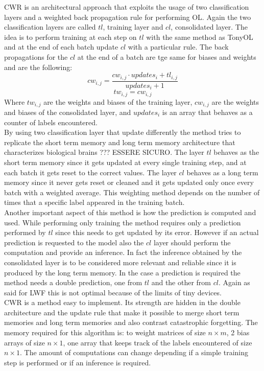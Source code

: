 \documentclass[12pt]{report}
\begin{document}
CWR is an architectural approach that exploits the usage of two classification layers and a weighted back propagation rule for performing OL. Again the two classification layers are called $tl$, training layer and $cl$, consolidated layer. The idea is to perform training at each step on $tl$ with the same method as TonyOL and at the end of each batch update $cl$ with a particular rule. The back propagations for the $cl$ at the end of a batch are tge same for biases and weights and are the following:
    \[     cw_{i,j} =  \frac{cw_{i,j} \cdot updates_{i} + tl_{i,j}}{updates_{i} + 1} \] 
    \[     tw_{i,j} =  cw_{i,j}\] 
Where $tw_{i,j}$ are the weights and biases of the training layer, $cw_{i,j}$ are the weights and biases of the consolidated layer, and $updates_{i}$ is an array that behaves as a counter of labels encountered.\\
By using two classification layer that update differently the method tries to replicate the short term memory and long term memory architecture that characterizes biological brains ??? ESSERE SICURO. The layer $tl$ behaves as the short term memory since it gets updated at every single training step, and at each batch it gets reset to the correct values. The layer $cl$ behaves as a long term memory since it never gets reset or cleaned and it gets updated only once every batch with a weighted average. This weighting method depends on the number of times that a specific label appeared in the training batch.\\
Another important aspect of this method is how the prediction is computed and used. While performing only training the method requires only a prediction performed by $tl$ since this needs to get updated by its error. However if an actual prediction is requested to the model also the $cl$ layer should perform the computation and provide an inference. In fact the inference obtained by the consolidated layer is to be considered more relevant and reliable since it is produced by the long term memory. In the case a prediction is required the method needs a double prediction, one from $tl$ and the other from $cl$. Again as said for LWF this is not optimal because of the limits of tiny devices. \\
CWR is a method easy to implement. Its strength are hidden in the double architecture and the update rule that make it possible to merge short term memories and long term memories and also contrast catastrophic forgetting. The memory required for this algorithm is: to weight matrices of size $n \times m$, 2 bias arrays of size $n \times 1$, one array that keeps track of the labels encountered of size $n \times 1$. The amount of computations can change depending if a simple training step is performed or if an inference is required.
\end{document}
